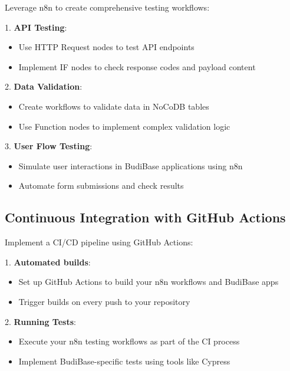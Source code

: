 Leverage n8n to create comprehensive testing workflows:

1. \textbf{API Testing}:
\begin{itemize}
    \item Use HTTP Request nodes to test API endpoints
    \item Implement IF nodes to check response codes and payload content
\end{itemize}

2. \textbf{Data Validation}:
\begin{itemize}
    \item Create workflows to validate data in NoCoDB tables
    \item Use Function nodes to implement complex validation logic
\end{itemize}

3. \textbf{User Flow Testing}:
\begin{itemize}
    \item Simulate user interactions in BudiBase applications using n8n
    \item Automate form submissions and check results
\end{itemize}


\subsection{Continuous Integration with GitHub Actions}

Implement a CI/CD pipeline using GitHub Actions:

1. \textbf{Automated builds}:
\begin{itemize}
    \item Set up GitHub Actions to build your n8n workflows and BudiBase apps
    \item Trigger builds on every push to your repository
\end{itemize}

2. \textbf{Running Tests}:
\begin{itemize}
    \item Execute your n8n testing workflows as part of the CI process
    \item Implement BudiBase-specific tests using tools like Cypress
\end{itemize}

